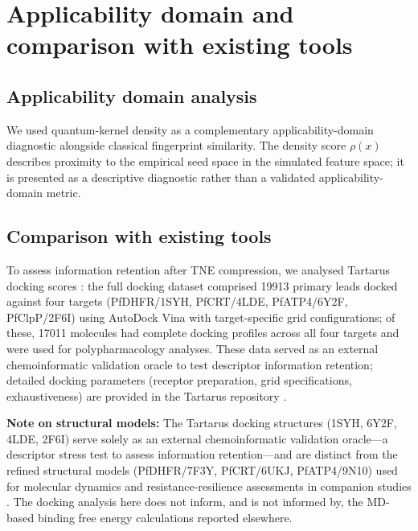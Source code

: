 \documentclass[11pt,a4paper]{article}
\begin{document}
\vspace{4mm}


\section{Applicability domain and comparison with existing tools}

\subsection{Applicability domain analysis}

We used quantum-kernel density as a complementary applicability-domain diagnostic alongside classical fingerprint similarity. The density score $\rho(x)$ describes proximity to the empirical seed space in the simulated feature space; it is presented as a descriptive diagnostic rather than a validated applicability-domain metric.

\subsection{Comparison with existing tools}
\label{SM-sec:si_tartarus_docking}

To assess information retention after TNE compression, we analysed Tartarus docking scores \citep{tartarus_2024}: the full docking dataset comprised \num{19913} primary leads docked against four targets (PfDHFR/1SYH, PfCRT/4LDE, PfATP4/6Y2F, PfClpP/2F6I) using AutoDock Vina with target-specific grid configurations; of these, \num{17011} molecules had complete docking profiles across all four targets and were used for polypharmacology analyses. These data served as an external chemoinformatic validation oracle to test descriptor information retention; detailed docking parameters (receptor preparation, grid specifications, exhaustiveness) are provided in the Tartarus repository \citep{tartarus_2024}.

\textbf{Note on structural models:} The Tartarus docking structures (1SYH, 6Y2F, 4LDE, 2F6I) serve solely as an external chemoinformatic validation oracle—a descriptor stress test to assess information retention—and are distinct from the refined structural models (PfDHFR/7F3Y, PfCRT/6UKJ, PfATP4/9N10) used for molecular dynamics and resistance-resilience assessments in companion studies \citep{temgoua2026tb,saognn2026}. The docking analysis here does not inform, and is not informed by, the MD-based binding free energy calculations reported elsewhere.
\end{document}
